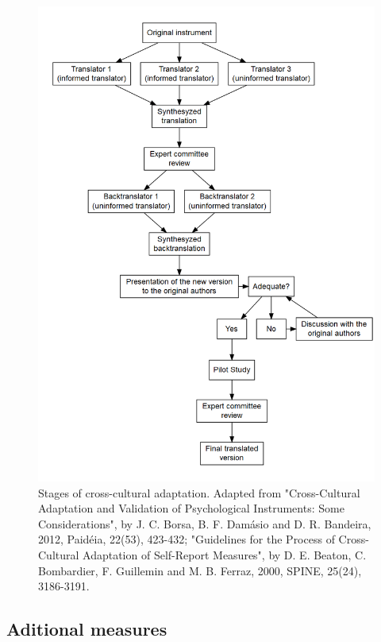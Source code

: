 \documentclass[
  ,doc,11pt, twoside,floatsintext]{apa6}
\begin{document}
\begin{figure}

{\centering \includegraphics{main_files/figure-latex/diag-1} 

}

\caption{Stages of cross-cultural adaptation. Adapted from "Cross-Cultural Adaptation and Validation of Psychological Instruments: Some Considerations", by J. C. Borsa, B. F. Damásio and D. R. Bandeira, 2012, Paidéia, 22(53), 423-432; "Guidelines for the Process of Cross-Cultural Adaptation of Self-Report Measures", by D. E. Beaton, C. Bombardier, F. Guillemin and M. B. Ferraz, 2000, SPINE, 25(24), 3186-3191.}\label{fig:diag}
\end{figure}

\hypertarget{aditional-measures}{%
\subsection{Aditional measures}\label{aditional-measures}}
\end{document}
